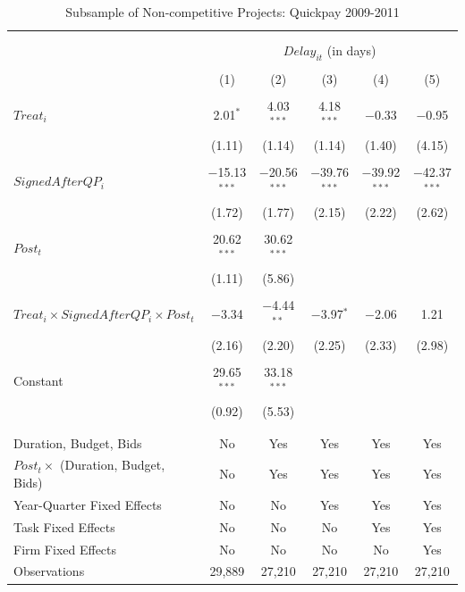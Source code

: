 \documentclass[
]{article}
\begin{document}
\begin{table}[H] \centering 
  \caption{Subsample of Non-competitive Projects: Quickpay 2009-2011} 
  \label{} 
\small 
\begin{tabular}{@{\extracolsep{-2pt}}lccccc} 
\\[-1.8ex]\hline 
\hline \\[-1.8ex] 
\\[-1.8ex] & \multicolumn{5}{c}{$Delay_{it}$ (in days)} \\ 
\\[-1.8ex] & (1) & (2) & (3) & (4) & (5)\\ 
\hline \\[-1.8ex] 
 $Treat_i$ & 2.01$^{*}$ & 4.03$^{***}$ & 4.18$^{***}$ & $-$0.33 & $-$0.95 \\ 
  & (1.11) & (1.14) & (1.14) & (1.40) & (4.15) \\ 
  & & & & & \\ 
 $SignedAfterQP_i$ & $-$15.13$^{***}$ & $-$20.56$^{***}$ & $-$39.76$^{***}$ & $-$39.92$^{***}$ & $-$42.37$^{***}$ \\ 
  & (1.72) & (1.77) & (2.15) & (2.22) & (2.62) \\ 
  & & & & & \\ 
 $Post_t$ & 20.62$^{***}$ & 30.62$^{***}$ &  &  &  \\ 
  & (1.11) & (5.86) &  &  &  \\ 
  & & & & & \\ 
 $Treat_i \times SignedAfterQP_i \times Post_t$ & $-$3.34 & $-$4.44$^{**}$ & $-$3.97$^{*}$ & $-$2.06 & 1.21 \\ 
  & (2.16) & (2.20) & (2.25) & (2.33) & (2.98) \\ 
  & & & & & \\ 
 Constant & 29.65$^{***}$ & 33.18$^{***}$ &  &  &  \\ 
  & (0.92) & (5.53) &  &  &  \\ 
  & & & & & \\ 
\hline \\[-1.8ex] 
Duration, Budget, Bids & No & Yes & Yes & Yes & Yes \\ 
$Post_t \times $  (Duration, Budget, Bids) & No & Yes & Yes & Yes & Yes \\ 
Year-Quarter Fixed Effects & No & No & Yes & Yes & Yes \\ 
Task Fixed Effects & No & No & No & Yes & Yes \\ 
Firm Fixed Effects & No & No & No & No & Yes \\ 
Observations & 29,889 & 27,210 & 27,210 & 27,210 & 27,210 \\ 

\end{tabular}
\end{table}
\end{document}
